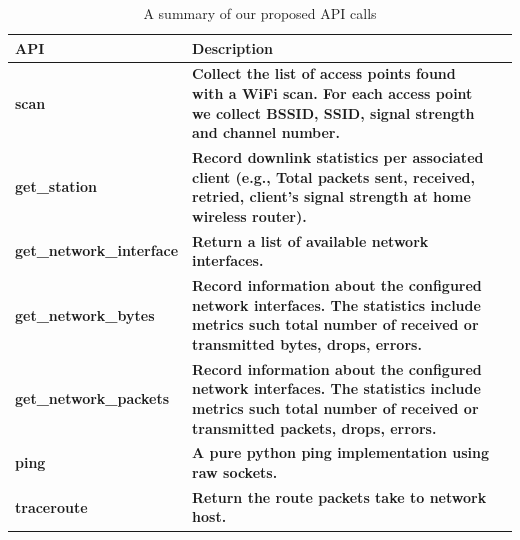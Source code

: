 \begin{table}
\scriptsize
\centering
\begin{tabular}{|p{}| p{}| m{}|}
\hline
\textbf{API}    &  \textbf{Description} \\
 \hline
 {\bf scan} & {\bf Collect the list of access points found with a WiFi scan. For each access point we collect BSSID, SSID, signal strength and channel number.} \\
\hline
 {\bf get\_station} & {\bf Record downlink statistics per associated client (e.g., Total packets sent, received, retried, client's signal strength at home wireless router).} \\
\hline
 {\bf get\_network\_interface} & {\bf Return a list of available network interfaces.} \\
\hline
 {\bf get\_network\_bytes} & {\bf Record information about the configured network interfaces. The statistics include metrics such total number of received or transmitted bytes, drops, errors.} \\
\hline
 {\bf get\_network\_packets} & {\bf Record information about the configured network interfaces. The statistics include metrics such total number of received or transmitted packets, drops, errors.} \\
\hline
 {\bf ping} & {\bf A pure python ping implementation using raw sockets.} \\
\hline
 {\bf traceroute} & {\bf Return the route packets take to network host. } \\
\hline
\end{tabular}
\caption {A summary of our proposed API calls}
\label{table:new_api}
\end{table}


